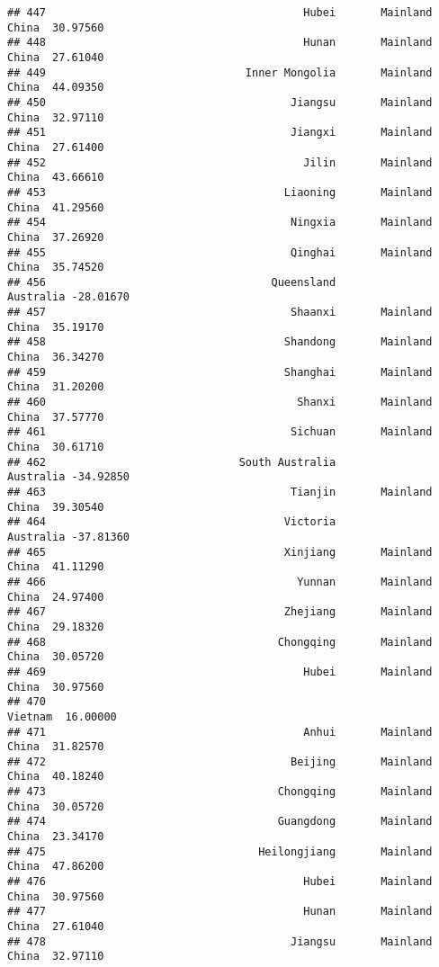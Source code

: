 \documentclass[
]{article}
\begin{document}
\begin{verbatim}
## 447                                        Hubei       Mainland China  30.97560
## 448                                        Hunan       Mainland China  27.61040
## 449                               Inner Mongolia       Mainland China  44.09350
## 450                                      Jiangsu       Mainland China  32.97110
## 451                                      Jiangxi       Mainland China  27.61400
## 452                                        Jilin       Mainland China  43.66610
## 453                                     Liaoning       Mainland China  41.29560
## 454                                      Ningxia       Mainland China  37.26920
## 455                                      Qinghai       Mainland China  35.74520
## 456                                   Queensland            Australia -28.01670
## 457                                      Shaanxi       Mainland China  35.19170
## 458                                     Shandong       Mainland China  36.34270
## 459                                     Shanghai       Mainland China  31.20200
## 460                                       Shanxi       Mainland China  37.57770
## 461                                      Sichuan       Mainland China  30.61710
## 462                              South Australia            Australia -34.92850
## 463                                      Tianjin       Mainland China  39.30540
## 464                                     Victoria            Australia -37.81360
## 465                                     Xinjiang       Mainland China  41.11290
## 466                                       Yunnan       Mainland China  24.97400
## 467                                     Zhejiang       Mainland China  29.18320
## 468                                    Chongqing       Mainland China  30.05720
## 469                                        Hubei       Mainland China  30.97560
## 470                                                           Vietnam  16.00000
## 471                                        Anhui       Mainland China  31.82570
## 472                                      Beijing       Mainland China  40.18240
## 473                                    Chongqing       Mainland China  30.05720
## 474                                    Guangdong       Mainland China  23.34170
## 475                                 Heilongjiang       Mainland China  47.86200
## 476                                        Hubei       Mainland China  30.97560
## 477                                        Hunan       Mainland China  27.61040
## 478                                      Jiangsu       Mainland China  32.97110

\end{verbatim}
\end{document}
